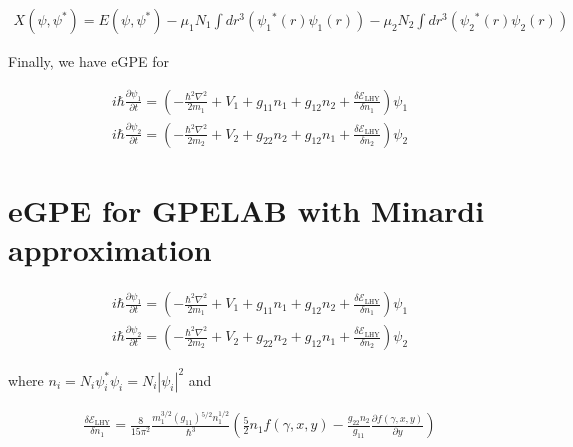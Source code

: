 \begin{equation}
\begin{split}
X\left(\psi ,\psi ^*\right)=E\left(\psi ,\psi ^*\right)-\mu _1 N_1\int dr^3\left(\psi _1{}^*(r)\psi _1(r)\right)-\mu _2 N_2\int dr^3\left(\psi
_2{}^*(r)\psi _2(r)\right)
\end{split}
\end{equation}

Finally, we have eGPE for 

\begin{equation}
\begin{split}
i \hbar \frac{\partial \psi _1}{\partial t}=\left(-\frac{\hbar ^2\nabla ^2}{2m_1}+V_1+g_{11}n_1+g_{12}n_2+\frac{\delta  \mathcal{E}_{\text{LHY}}}{\delta
 n_1}\right)\psi _1\\
i \hbar \frac{\partial \psi _2}{\partial t}=\left(-\frac{\hbar ^2\nabla ^2}{2m_2}+V_2+g_{22}n_2+g_{12}n_1+\frac{\delta  \mathcal{E}_{\text{LHY}}}{\delta
 n_2}\right)\psi _2
\end{split}
\end{equation}

\section{eGPE for GPELAB with Minardi approximation}

\begin{equation}
\begin{split}
i \hbar \frac{\partial \psi _1}{\partial t}=\left(-\frac{\hbar ^2\nabla ^2}{2m_1}+V_1+g_{11}n_1+g_{12}n_2+\frac{\delta  \mathcal{E}_{\text{LHY}}}{\delta
 n_1}\right)\psi _1\\
i \hbar \frac{\partial \psi _2}{\partial t}=\left(-\frac{\hbar ^2\nabla ^2}{2m_2}+V_2+g_{22}n_2+g_{12}n_1+\frac{\delta  \mathcal{E}_{\text{LHY}}}{\delta
 n_2}\right)\psi _2
\end{split}
\end{equation}

where
\(n_i=N_i\psi _i^*\psi _i=N_i|\psi _i|^2\)
and 

\begin{equation}
\begin{split}
\frac{\delta  \mathcal{E}_{\text{LHY}}}{\delta  n_1}=\frac{8}{15\pi ^2}\frac{m_1^{3/2}\left(g_{11}\right){}^{5/2}n_1^{1/2}}{\hbar ^3}\left(\frac{5}{2}n_1f(\gamma
,x,y)-\frac{g_{22}n_2}{g_{11}}\frac{\partial f(\gamma ,x,y)}{\partial y}\right)
\end{split}
\end{equation}

